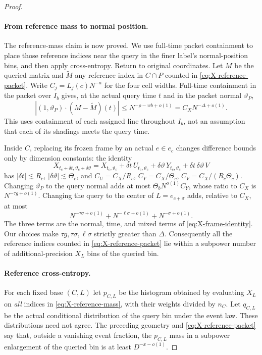 \begin{proof}
\paragraph{From reference mass to normal position.}
The reference-mass claim is now proved. We use full-time packet
containment to place those reference indices near the query in the
finer label's normal-position bins, and then apply cross-entropy.
Return to original coordinates. Let $M$ be the queried matrix and
$\widetilde M$ any reference index in $C\cap P$ counted in
\eqref{eq:X-reference-packet}. Write
$C_j=L_j(c)N^{-a}$ for the four cell widths. Full-time containment
in the packet over $I_b$ gives, at the actual query time $t$ and
in the packet normal $\vartheta_P$,
\[
 |(1,\vartheta_P)\cdot(M-\widetilde M)(t)|
 \le N^{-\rho-wb+o(1)}
 = C_XN^{-\Delta+o(1)}.
\]
This uses containment of each assigned line throughout $I_b$, not
an assumption that each of its shadings meets the query time.

Inside $C$, replacing its frozen frame by an actual $e\in e_c$
changes difference bounds only by dimension constants: the identity
\begin{equation}
X_{t_c+\delta t,\vartheta_c+\delta\vartheta}
 =X_{t_c,\vartheta_c}+\delta t\,U_{t_c,\vartheta_c}
       +\delta\vartheta\,Y_{t_c,\vartheta_c}
       +\delta t\,\delta\vartheta\,V
\label{eq:X-frame-identity}
\end{equation}
has $|\delta t|\lesssim R_c$, $|\delta\vartheta|\lesssim\Theta_c$, and
$C_U=C_X/R_c$, $C_Y=C_X/\Theta_c$,
$C_V=C_X/(R_c\Theta_c)$. Changing $\vartheta_P$ to the query
normal adds at most $\Theta_bN^{o(1)}C_Y$, whose ratio to $C_X$
is $N^{-\tau g+o(1)}$. Changing the query to the center of
$L=e_{c+\sigma}$ adds, relative to $C_X$, at most
\begin{equation}
 N^{-\tau\sigma+o(1)}
 +N^{-\ell\sigma+o(1)}+N^{-\sigma+o(1)}.
\label{eq:X-finer-frame-errors}
\end{equation}
The three terms are the normal, time, and mixed terms of
\eqref{eq:X-frame-identity}. Our choices make
$\tau g,\tau\sigma,\ell\sigma$ strictly greater than
$\Delta$. Consequently all the reference indices counted in
\eqref{eq:X-reference-packet} lie within a subpower number of
additional-precision $X_L$ bins of the queried bin.

\paragraph{Reference cross-entropy.}
For each fixed base $(C,L)$ let $p_{C,L}$ be the histogram obtained
by evaluating $X_L$ on \emph{all} indices in
\eqref{eq:X-reference-mass}, with their weights divided by $n_C$.
Let $q_{C,L}$ be the actual conditional distribution of the query
bin under the event law. These distributions need not agree.
The preceding geometry and \eqref{eq:X-reference-packet} say that,
outside a vanishing event fraction, the $p_{C,L}$ mass in a
subpower enlargement of the queried bin is at least
$D^{-x-o(1)}$.


\end{proof}
